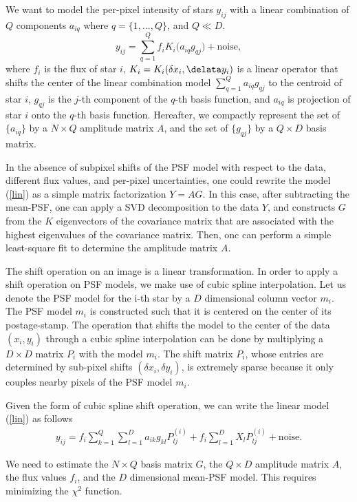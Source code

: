 \documentclass[12pt,preprint]{aastex}
\newcommand{\beq}{\begin{equation}}
\newcommand{\eeq}{\end{equation}}
\begin{document}
We want to model the per-pixel intensity of stars $y_{ij}$ with
a linear combination of $Q$ components $a_{iq}$ where $q=\{1,...,Q\}$, and $Q\ll D$.
\beq
y_{ij} = \sum_{q=1}^{Q} f_{i}K_{i}\big(a_{iq}g_{qj}\big) + \text{noise},
\label{lin}
\eeq
where $f_{i}$ is the flux of star $i$, $K_{i} = K_{i}(\delta x_{i} , \delata y_{i})$
is a linear operator that shifts the center of the linear 
combination model $\sum_{q=1}^{Q}a_{iq}g_{qj}$ to the centroid 
of star $i$, $g_{qj}$ is the $j$-th component of the $q$-th 
basis function, and $a_{iq}$ is projection
of star $i$ onto the $q$-th basis function. 
Hereafter, we compactly represent the set
of $\{a_{iq}\}$ by a $N\times Q$ amplitude matrix $A$, 
and the set of $\{g_{qj}\}$
by a $Q\times D$ basis matrix.

 In the absence of subpixel shifts of the PSF model
with respect to the data, different flux values, and per-pixel 
uncertainties, one could rewrite the model (\ref{lin}) as a 
simple matrix factorization $Y = AG$. In this case, after 
subtracting the mean-PSF, one can apply a SVD decomposition 
to the data $Y$, and constructs $G$ from the $K$ eigenvectors 
of the covariance matrix that are associated with the highest 
eigenvalues of the covariance matrix. Then, onc can perform a simple 
least-square fit to determine the amplitude matrix $A$. 

The shift operation on an image is a linear transformation. In order to
apply a shift operation on PSF models, we make use of cubic spline interpolation.
Let us denote the PSF model for the i-th star by a $D$ dimensional column 
vector $m_{i}$. The PSF model $m_{i}$ is constructed such that it is centered
on the center of its postage-stamp. The operation that shifts the model to the
center of the data $(x_{i} , y_{i})$ through a cubic spline interpolation can
be done by multiplying a $D\times D$ matrix $P_{i}$ with  the model $m_{i}$.
The shift matrix $P_{i}$, whose entries are determined by sub-pixel shifts $(\delta x_{i}
, \delta y_{i})$, is extremely sparse because it only couples nearby pixels of 
the PSF model $m_{i}$.

Given the form of cubic spline shift operation, we can write the linear model 
(\ref{lin}) as follows
\begin{eqnarray}
y_{ij} = f_{i} \sum_{k=1}^{Q}\sum_{l=1}^{D} a_{ik}g_{kl}P^{(i)}_{lj} +
         f_{i}\sum_{l=1}^{D} X_{l}P^{(i)}_{lj} + \text{noise}.
\label{model}
\end{eqnarray}

We need to estimate the $N\times Q$ basis matrix $G$, the $Q \times D$ amplitude 
matrix $A$, the flux values $f_{i}$, and the $D$ dimensional mean-PSF model.
This requires minimizing the $\chi^{2}$ function.
\end{document}
